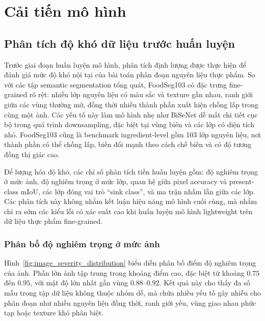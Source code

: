 \section{Cải tiến mô hình}
\subsection{Phân tích độ khó dữ liệu trước huấn luyện}
\label{subsec:pretrain_data_analysis}

Trước giai đoạn huấn luyện mô hình, phân tích định lượng được thực hiện để đánh giá mức độ khó nội tại của bài toán phân đoạn nguyên liệu thực phẩm. So với các tập semantic segmentation tổng quát, FoodSeg103 có đặc trưng fine-grained rõ rệt: nhiều lớp nguyên liệu có màu sắc và texture gần nhau, ranh giới giữa các vùng thường mờ, đồng thời nhiều thành phần xuất hiện chồng lấp trong cùng một ảnh. Các yếu tố này làm mô hình nhẹ như BiSeNet dễ mất chi tiết cục bộ trong quá trình downsampling, đặc biệt tại vùng biên và các lớp có diện tích nhỏ. FoodSeg103 cũng là benchmark ingredient-level gồm 103 lớp nguyên liệu, nơi thành phần có thể chồng lấp, biến đổi mạnh theo cách chế biến và có độ tương đồng thị giác cao.

Để lượng hóa độ khó, các chỉ số phân tích tiền huấn luyện gồm: độ nghiêm trọng ở mức ảnh, độ nghiêm trọng ở mức lớp, quan hệ giữa pixel accuracy và present-class mIoU, các lớp đóng vai trò ``sink class'', và ma trận nhầm lẫn giữa các lớp. Các phân tích này không nhằm kết luận hiệu năng mô hình cuối cùng, mà nhằm chỉ ra sớm các kiểu lỗi có xác suất cao khi huấn luyện mô hình lightweight trên dữ liệu thực phẩm fine-grained.

\subsubsection{Phân bố độ nghiêm trọng ở mức ảnh}

Hình~\ref{fig:image_severity_distribution} biểu diễn phân bố điểm độ nghiêm trọng của ảnh. Phần lớn ảnh tập trung trong khoảng điểm cao, đặc biệt từ khoảng $0.75$ đến $0.95$, với mật độ lớn nhất gần vùng $0.88$--$0.92$. Kết quả này cho thấy đa số mẫu trong tập dữ liệu không thuộc nhóm dễ, mà chứa nhiều yếu tố gây nhiễu cho phân đoạn như nhiều nguyên liệu đồng thời, ranh giới yếu, vùng giao nhau phức tạp hoặc texture khó phân biệt.

